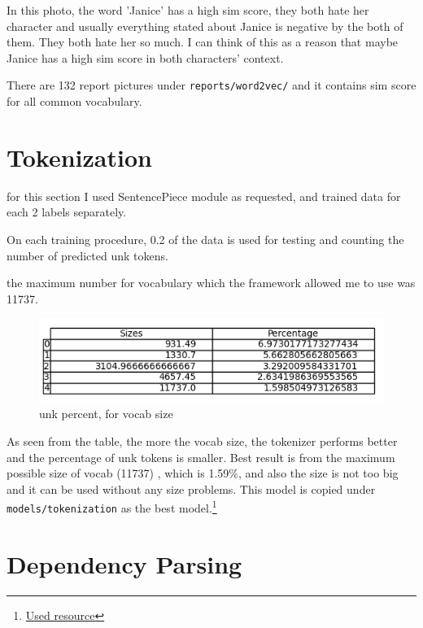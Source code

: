 \documentclass{article}
\begin{document}
\par In this photo, the word 'Janice' has a high sim score, they both hate her character and usually everything stated about Janice is negative by the both of them. They both hate her so much. I can think of this as a reason that maybe Janice has a high sim score in both characters' context.\\

\par There are 132 report pictures under \texttt{reports/word2vec/} and it contains sim score for all common vocabulary.

\section{Tokenization}
\par for this section I used SentencePiece module as requested, and trained data for each 2 labels separately.
\par On each training procedure, 0.2 of the data is used for testing and counting the number of predicted unk tokens.
\par the maximum number for vocabulary which the framework allowed me to use was 11737.

\begin{figure}[H]
    \centering
    \includegraphics[width=\inewidth]{../reports/tokenization/percentages.png}
    \caption{unk percent, for vocab size}
\end{figure}

\par As seen from the table, the more the vocab size, the tokenizer performs better and the percentage of unk tokens is smaller. Best result is from the maximum possible size of vocab (11737) , which is 1.59\%, and also the size is not too big and it can be used without any size problems. This model is copied under \texttt{models/tokenization} as the best model.\footnote{\href{https://colab.research.google.com/github/google/sentencepiece/blob/master/python/sentencepiece_python_module_example.ipynb#scrollTo=ee9W6wGnVteW}{Used resource}}

\section{Dependency Parsing}
\end{document}
